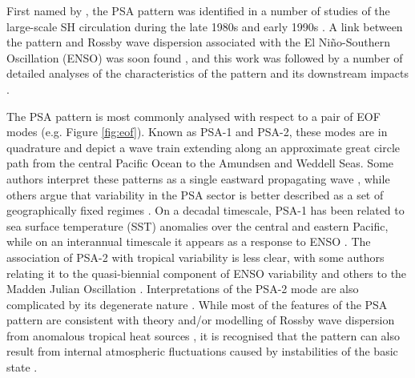 First named by \citet{Mo1987}, the PSA pattern was identified in a number of studies of the large-scale SH circulation during the late 1980s and early 1990s \citep[e.g.][]{Kidson1988,Ghil1991,Lau1994}. A link between the pattern and Rossby wave dispersion associated with the El Ni\~{n}o-Southern Oscillation (ENSO) was soon found \citep[e.g.][]{Karoly1989}, and this work was followed by a number of detailed analyses of the characteristics of the pattern and its downstream impacts \citep[e.g.][]{Mo1998,Mo2000,Mo2001}.

The PSA pattern is most commonly analysed with respect to a pair of EOF modes (e.g. Figure \ref{fig:eof}). Known as PSA-1 and PSA-2, these modes are in quadrature and depict a wave train extending along an approximate great circle path from the central Pacific Ocean to the Amundsen and Weddell Seas. Some authors interpret these patterns as a single eastward propagating wave \citep{Mo1998}, while others argue that variability in the PSA sector is better described as a set of geographically fixed regimes \citep{Robertson2003}. On a decadal timescale, PSA-1 has been related to sea surface temperature (SST) anomalies over the central and eastern Pacific, while on an interannual timescale it appears as a response to ENSO \citep{Mo2001}. The association of PSA-2 with tropical variability is less clear, with some authors relating it to the quasi-biennial component of ENSO variability \citep{Mo2000} and others to the Madden Julian Oscillation \citep{Renwick1999}. Interpretations of the PSA-2 mode are also complicated by its degenerate \citep{North1982} nature \citep[e.g. Figure 1;][]{Mo2000}. While most of the features of the PSA pattern are consistent with theory and/or modelling of Rossby wave dispersion from anomalous tropical heat sources \citep[e.g.][]{Liu2007,Li2015}, it is recognised that the pattern can also result from internal atmospheric fluctuations caused by instabilities of the basic state \citep[and that both mechanisms likely act in concert; e.g.][]{Grimm2009}.

